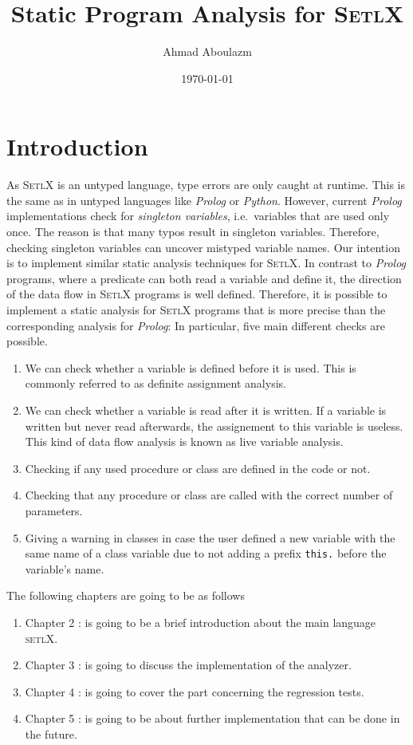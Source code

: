 \documentclass[11pt]{report}
\begin{document}
\title{Static Program Analysis for \textsc{SetlX}}
\author{Ahmad Aboulazm}
\date{\today}
\maketitle
\pagebreak
\tableofcontents
\pagebreak


\chapter{Introduction}
As \textsc{SetlX} is an untyped language, type errors are only caught at runtime.  This is the same
as in untyped languages like \textsl{Prolog} or \textsl{Python}.  However, current \textsl{Prolog}
implementations check for \emph{singleton variables}, i.e.~variables that are used only once.  The
reason is that many typos result in singleton variables.  Therefore, checking singleton variables
can uncover mistyped variable names.  Our intention 
is to implement similar static analysis techniques for \textsc{SetlX}.  In contrast to
\textsl{Prolog} programs, where a predicate can both read a variable and define it, the direction of
the data flow in \textsc{SetlX} programs is well defined.  Therefore, it is possible to implement a
static analysis for \textsc{SetlX} programs that is more precise than the corresponding analysis for
\textsl{Prolog}:  In particular, five main different checks are possible.

\begin{enumerate}
\item We can check whether a variable is defined before it is used.
      This is commonly referred to as definite assignment analysis.
\item We can check whether a variable is read after it is written.  If a variable is written but
      never read afterwards, the assignement to this variable is useless.  This kind of data flow
      analysis is known as live variable analysis.
\item Checking if any used procedure or class are defined in the code or not.
\item Checking that any procedure or class are called with the correct number of parameters.
\item Giving a warning in classes in case the user defined a new variable with the same name of a class variable due to not adding a prefix \texttt{this.} before the variable's name.
\end{enumerate}

The following chapters are going to be as follows
\begin{enumerate}
\item Chapter 2 : is going to be a brief introduction about the main language \textsc{setlX}.
\item Chapter 3 : is going to discuss the implementation of the analyzer.
\item Chapter 4 : is going to cover the part concerning the regression tests.
\item Chapter 5 : is going to be about further implementation that can be done in the future.
\end{enumerate}
\end{document}

